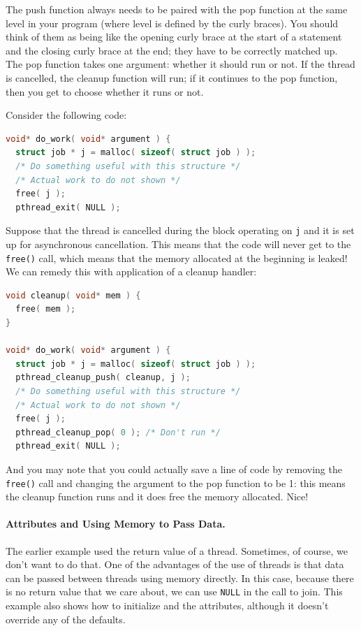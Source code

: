 \documentclass[a4paper]{report}
\begin{document}
The push function always needs to be paired with the pop function at the same level in your program (where level is defined by the curly braces). You should think of them as being like the opening curly brace at the start of a statement and the closing curly brace at the end; they have to be correctly matched up. The pop function takes one argument: whether it should run or not. If the thread is cancelled, the cleanup function will run; if it continues to the pop function, then you get to choose whether it runs or not.

Consider the following code:
\begin{lstlisting}[language=C]
void* do_work( void* argument ) {
  struct job * j = malloc( sizeof( struct job ) );
  /* Do something useful with this structure */
  /* Actual work to do not shown */
  free( j );
  pthread_exit( NULL );
\end{lstlisting}

Suppose that the thread is cancelled during the block operating on \texttt{j} and it is set up for asynchronous cancellation. This means that the code will never get to the \texttt{free()} call, which means that the memory allocated at the beginning is leaked! We can remedy this with application of a cleanup handler:
\begin{lstlisting}[language=C]
void cleanup( void* mem ) {
  free( mem );
}

void* do_work( void* argument ) {
  struct job * j = malloc( sizeof( struct job ) );
  pthread_cleanup_push( cleanup, j );
  /* Do something useful with this structure */
  /* Actual work to do not shown */
  free( j );
  pthread_cleanup_pop( 0 ); /* Don't run */
  pthread_exit( NULL );
\end{lstlisting}

And you may note that you could actually save a line of code by removing the \texttt{free()} call and changing the argument to the pop function to be 1: this means the cleanup function runs and it does free the memory allocated. Nice!


\paragraph{Attributes and Using Memory to Pass Data.}
The earlier example used the return value of a thread. Sometimes, of course, we don't want to do that. One of the advantages of the use of threads is that data can be passed between threads using memory directly. In this case, because there is no return value that we care about, we can use \texttt{NULL} in the call to join. This example also shows how to initialize and the attributes, although it doesn't override any of the defaults.
\end{document}
